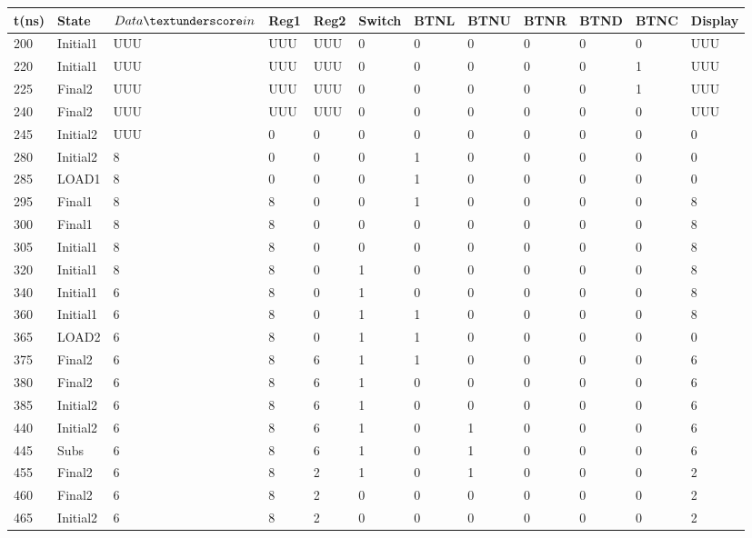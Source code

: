 \documentclass[12pt]{article}
\begin{document}
\begin{table}[]
   
    \hskip-1.0cm\begin{tabular}{|l|l|l|l|l|l|l|l|l|l|l|l|}
    \hline
        t(ns) & State & $Data\textunderscore in$  & Reg1 & Reg2 & Switch & BTNL & BTNU & BTNR & BTND& BTNC& Display\\
        \hline
        200 & Initial1 & UUU & UUU&UUU&0&0&0&0&0&0&UUU\\
        \hline
         220 & Initial1 & UUU & UUU&UUU&0&0&0&0&0&1&UUU\\
        \hline
         225 & Final2 & UUU & UUU&UUU&0&0&0&0&0&1&UUU\\
        \hline
        240 & Final2 & UUU & UUU&UUU&0&0&0&0&0&0&UUU\\
        \hline
        245 & Initial2 & UUU & 0&0&0&0&0&0&0&0&0\\
        \hline
        280 & Initial2 & 8 & 0&0&0&1&0&0&0&0&0\\
        \hline
        285 & LOAD1 & 8 & 0&0&0&1&0&0&0&0&0\\
        \hline
        295 & Final1 & 8 & 8&0&0&1&0&0&0&0&8\\
        \hline
        300 & Final1 & 8 & 8&0&0&0&0&0&0&0&8\\
        \hline
        305 & Initial1 & 8 & 8&0&0&0&0&0&0&0&8\\
        \hline
        320 & Initial1 & 8 & 8&0&1&0&0&0&0&0&8\\
        \hline
        340 & Initial1 & 6 & 8&0&1&0&0&0&0&0&8\\
        \hline
        360 & Initial1 & 6 & 8&0&1&1&0&0&0&0&8\\
        \hline
        365 & LOAD2 & 6 & 8&0&1&1&0&0&0&0&0\\
        \hline
        375 & Final2 & 6 & 8&6&1&1&0&0&0&0&6\\
        \hline
        380 & Final2 & 6 & 8&6&1&0&0&0&0&0&6\\
        \hline
        385 & Initial2 & 6 & 8&6&1&0&0&0&0&0&6\\
        \hline
        440 & Initial2 & 6 & 8&6&1&0&1&0&0&0&6\\
        \hline
        445 & Subs & 6 & 8&6&1&0&1&0&0&0&6\\
        \hline
        455 & Final2 & 6 & 8&2&1&0&1&0&0&0&2\\
        \hline
        460 & Final2 & 6 & 8&2&0&0&0&0&0&0&2\\
        \hline
        465 & Initial2 & 6 & 8&2&0&0&0&0&0&0&2\\

\end{tabular}
\end{table}
\end{document}
